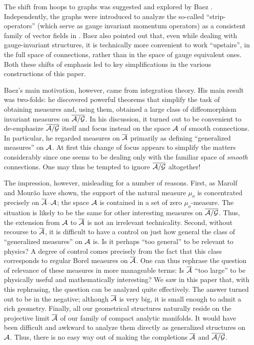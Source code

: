 The shift from hoops to graphs was suggested and explored by Baez
\cite{B1,B2}. Independently, the graphs were introduced to analyze
the so-called ``strip-operators'' (which serve as gauge invariant
momentum operators) as a consistent family of vector fields in
\cite{Le2}. Baez also pointed out that, even while dealing with
gauge-invariant structures, it is technically more convenient to work
``upstairs'', in the full space of connections, rather than in the
space of gauge equivalent ones. Both these shifts of emphasis led to
key simplifications in the various constructions of this paper.

Baez's main motivation, however, came from integration theory. His
main result was two-folds: he discovered powerful theorems that
simplify the task of obtaining measures and, using them, obtained a
large class of diffeomorphism invariant measures on $\overline{{\cal A}/{\cal G}}$.  In his
discussion, it turned out to be convenient to de-emphasize $\overline{{\cal A}/{\cal G}}$
itself and focus instead on the space ${\cal A}$ of smooth connections. In
particular, he regarded measures on ${\overline {{\cal A}}}$ primarily as defining
``generalized measures'' on ${\cal A}$. At first this change of focus
appears to simplify the matters considerably since one seems to be
dealing only with the familiar space of {\it smooth} connections. One
may thus be tempted to ignore $\overline{{\cal A}/{\cal G}}$ altogether!

The impression, however, misleading for a number of reasons. First, as
Marolf and Mour\~ao \cite{MM} have shown, the support of the natural
measure $\mu_o$ is concentrated precisely on ${\overline {{\cal A}}}$--${\cal A}$; the space
${\cal A}$ is contained in a set of zero $\mu_o$-measure. The situation is
likely to be the same for other interesting measures on $\overline{{\cal A}/{\cal G}}$.
Thus, the extension from ${\cal A}$ to ${\overline {{\cal A}}}$ is not an irrelevant
technicality.  Second, without recourse to ${\overline {{\cal A}}}$, it is difficult to
have a control on just how general the class of ``generalized
measures'' on ${\cal A}$ is.  Is it perhaps ``too general'' to be relevant
to physics?  A degree of control comes precisely from the fact that
this class corresponds to regular Borel measures on ${\overline {{\cal A}}}$. One can
thus rephrase the question of relevance of these measures in more
manageable terms: Is ${\overline {{\cal A}}}$ ``too large'' to be physically useful and
mathematically interesting? We saw in this paper that, with this
rephrasing, the question can be analyzed quite effectively.  The
answer turned out to be in the negative; although ${\overline {{\cal A}}}$ is very big,
it is small enough to admit a rich geometry. Finally, all our
geometrical structures naturally reside on the projective limit ${\overline {{\cal A}}}$
of our family of compact analytic manifolds. It would have been
difficult and awkward to analyze them directly as generalized
structures on ${\cal A}$. Thus, there is no easy way out of making the
completions ${\overline {{\cal A}}}$ and $\overline{{\cal A}/{\cal G}}$.

